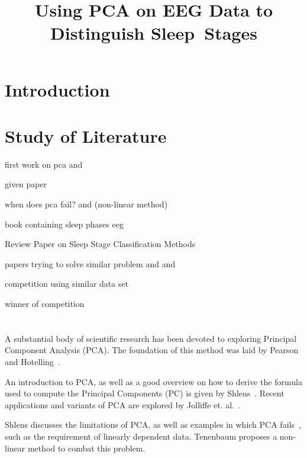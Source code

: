 \documentclass[a4paper]{IEEEtran}
\title{Using PCA on EEG Data to Distinguish Sleep~Stages}
\author{\IEEEauthorblockN{Ida Hönigmann}
	\IEEEauthorblockA{\\Technical University Vienna, Austria\\
		Email: e12002348@student.tuwien.ac.at}}
\begin{document}
\maketitle

\begin{abstract}

\end{abstract}

\section{Introduction}

\section{Study of Literature}
\label{sec:study_of_literature}

first work on pca \cite{Pearson1901} and \cite{Hotelling1933}

given paper \cite{Jolliffe2016}

when does pca fail? \cite{Shlens2014} and \cite{Tenenbaum2000} (non-linear method)

book containing sleep phases eeg \cite{Ganong1997}

Review Paper on Sleep Stage Classification Methods \cite{Boostani2017}

papers trying to solve similar problem \cite{Tautan2021} and \cite{Putilov2015} and \cite{Metzner2023}

competition using similar data set \cite{Ghassemi2018}

winner of competition \cite{Howe2018}
\\
\\
\\
A substantial body of scientific research has been devoted to exploring Principal Component Analysis (PCA).
The foundation of this method was laid by Pearson~\cite{Pearson1901} and Hotelling~\cite{Hotelling1933}.

An introduction to PCA, as well as a good overview on how to derive the formula used to compute the Principal Components (PC) is given by Shlens~\cite{Shlens2014}.
Recent applications and variants of PCA are explored by Jolliffe et. al.~\cite{Jolliffe2016}.

Shlens discusses the limitations of PCA, as well as examples in which PCA fails~\cite{Shlens2014}, such as the requirement of linearly dependent data.
Tenenbaum proposes a non-linear method to combat this problem\cite{Tenenbaum2000}.
\end{document}
